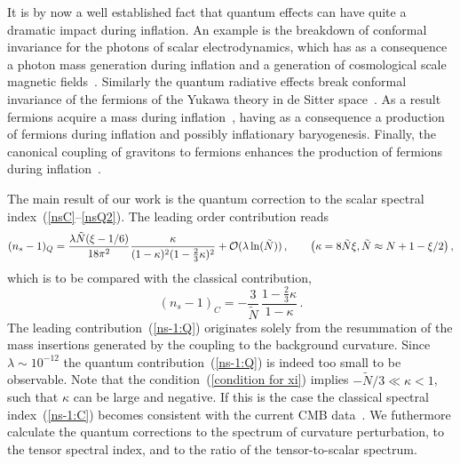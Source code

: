 \documentclass[aps,12pt,superscriptaddress,preprintnumbers,
                secnumarabic,nofootinbib,showpacs]{revtex4}
\begin{document}
 It is by now a well established fact that quantum effects can
have quite a dramatic impact during inflation. An example is
the breakdown of conformal invariance for the photons
of scalar electrodynamics,
which has as a consequence a photon mass generation during inflation and
a generation of cosmological scale magnetic fields~\cite{Prokopec:PhotonMass}.
Similarly the quantum radiative effects break conformal invariance of the
fermions of the Yukawa theory in de Sitter space~\cite{ProkopecWoodard:2003}.
As a result fermions acquire a mass during
inflation~\cite{ProkopecWoodard:2003,Garbrecht:2006jm}, having as a consequence
a production of fermions during inflation and possibly
inflationary baryogenesis. Finally, the canonical coupling of gravitons
to fermions enhances the production of fermions during
inflation~\cite{MiaoWoodard:2005+2006}.

 The main result of our work is the quantum correction to
the scalar spectral index~(\ref{nsC}--\ref{nsQ2}).
The leading order contribution reads
\begin{equation}
(n_s-1)_Q = \frac{\lambda\tilde{N}(\xi-1/6)}{18\pi^2}\frac{\kappa}{(1-\kappa)^2(1-\frac23\kappa)^2} +{\cal O}(\lambda \ln(\tilde N))
\,,\qquad
\big(\kappa = 8\tilde N\xi, \tilde N\approx N+1-\xi/2\big)
\label{ns-1:Q}
\,,
\end{equation}
which is to be compared with the classical contribution,
\begin{equation}
(n_s-1)_C = -\frac{3}{\tilde N}\,\frac{1-\frac23\kappa}{1-\kappa}
\label{ns-1:C}
\,.
\end{equation}
The leading contribution~(\ref{ns-1:Q}) originates solely from the resummation
of the mass insertions generated by the coupling to the background curvature.
Since $\lambda \sim 10^{-12}$ the quantum contribution~(\ref{ns-1:Q})
is indeed too small to be observable. Note that the
condition~(\ref{condition for xi}) implies $-\tilde N/3\ll \kappa<1$,
such that $\kappa$ can be large and negative. If this is the case
the classical spectral index~(\ref{ns-1:C}) becomes consistent with
the current CMB data~\cite{Spergel:2006}.
We futhermore calculate the quantum corrections to the spectrum of curvature
perturbation, to the tensor spectral index, and to the ratio
of the tensor-to-scalar spectrum.
\end{document}
